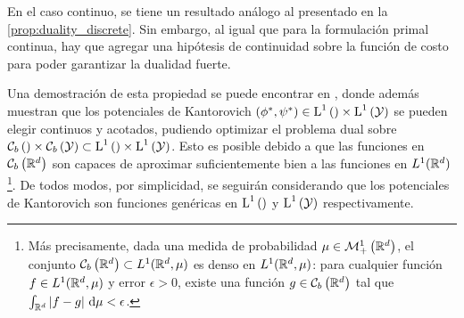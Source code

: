 En el caso continuo, se tiene un resultado análogo al presentado en la \autoref{prop:duality_discrete}. Sin embargo, al igual que para la formulación primal continua, hay que agregar una hipótesis de continuidad sobre la función de costo para poder garantizar la dualidad fuerte.


Una demostración de esta propiedad se puede encontrar en \cite{villani2003topics}, donde además muestran que los potenciales de Kantorovich $(\phi^*,\psi^*)\in \operatorname{L}^{1}\left(\right)\times\operatorname{L}^{1}\left(\mathcal{Y}\right)$ se pueden elegir continuos y acotados, pudiendo optimizar el problema dual sobre $\mathcal{C}_b\left(\right)\times\mathcal{C}_b\left(\mathcal{Y}\right)\subset\operatorname{L}^{1}\left(\right)\times\operatorname{L}^{1}\left(\mathcal{Y}\right)$. Esto es posible debido a que las funciones en $\mathcal{C}_b\left(\mathbb{R}^d\right)$ son capaces de aproximar suficientemente bien a las funciones en $L^1(\mathbb{R}^d)$\footnote{Más precisamente, dada una medida de probabilidad $\mu\in\mathcal{M}_+^1\left(\mathbb{R}^d\right)$, el conjunto $\mathcal{C}_b\left(\mathbb{R}^d\right)\subset L^1(\mathbb{R}^d,\mu)$ es denso en $L^1(\mathbb{R}^d,\mu)$: para cualquier función $f\in L^1(\mathbb{R}^d,\mu)$ y error $\epsilon>0$, existe una función $g\in\mathcal{C}_b\left(\mathbb{R}^d\right)$ tal que $\int_{\mathbb{R}^d} |f-g| \,\operatorname{d}\!\mu<\epsilon$.}. De todos modos, por simplicidad, se seguirán considerando que los potenciales de Kantorovich son funciones genéricas en $\operatorname{L}^{1}\left(\right)$ y $\operatorname{L}^{1}\left(\mathcal{Y}\right)$ respectivamente.


